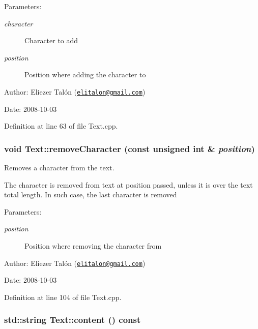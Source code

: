 \begin{Desc}
\item[Parameters:]
\begin{description}
\item[{\em character}]Character to add \item[{\em position}]Position where adding the character to\end{description}
\end{Desc}
\begin{Desc}
\item[Author:]Eliezer Talón (\href{mailto:elitalon@gmail.com}{\tt elitalon@gmail.com}) \end{Desc}
\begin{Desc}
\item[Date:]2008-10-03 \end{Desc}


Definition at line 63 of file Text.cpp.\hypertarget{class_text_e04500eeada2a4a3bb00554b32263c52}{
\subsubsection[removeCharacter]{\setlength{\rightskip}{0pt plus 5cm}void Text::removeCharacter (const unsigned int \& {\em position})}}
\label{class_text_e04500eeada2a4a3bb00554b32263c52}


Removes a character from the text. 

The character is removed from text at position passed, unless it is over the text total length. In such case, the last character is removed

\begin{Desc}
\item[Parameters:]
\begin{description}
\item[{\em position}]Position where removing the character from\end{description}
\end{Desc}
\begin{Desc}
\item[Author:]Eliezer Talón (\href{mailto:elitalon@gmail.com}{\tt elitalon@gmail.com}) \end{Desc}
\begin{Desc}
\item[Date:]2008-10-03 \end{Desc}


Definition at line 104 of file Text.cpp.\hypertarget{class_text_58a34fa2cfd0c240a7517132017b6a83}{
\subsubsection[content]{\setlength{\rightskip}{0pt plus 5cm}std::string Text::content () const}}
\label{class_text_58a34fa2cfd0c240a7517132017b6a83}



